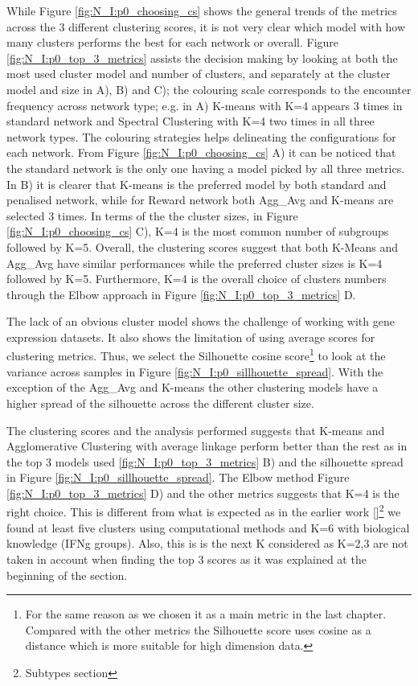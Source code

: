 While Figure \ref{fig:N_I:p0_choosing_cs} shows the general trends of the metrics across the 3 different clustering scores, it is not very clear which model with how many clusters performs the best for each network or overall. Figure \ref{fig:N_I:p0_top_3_metrics} assists the decision making by looking at both the most used cluster model and number of clusters, and separately at the cluster model and size in A), B) and C); the colouring scale corresponds to the encounter frequency across network type; e.g. in A) K-means with K=4 appears 3 times in standard network and Spectral Clustering with K=4 two times in all three network types. The colouring strategies helps delineating the configurations for each network. From Figure \ref{fig:N_I:p0_choosing_cs} A) it can be noticed that the standard network is the only one having a model picked by all three metrics. In B) it is clearer that K-means is the preferred model by both standard and penalised network, while for Reward network both Agg\_Avg and K-means are selected 3 times. In terms of the the cluster sizes, in Figure \ref{fig:N_I:p0_choosing_cs} C), K=4 is the most common number of subgroups followed by K=5. Overall, the clustering scores suggest that both K-Means and Agg\_Avg have similar performances while the preferred cluster sizes is K=4 followed by K=5. Furthermore, K=4 is the overall choice of clusters numbers through the Elbow approach in Figure \ref{fig:N_I:p0_top_3_metrics} D.


The lack of an obvious cluster model shows the challenge of working with gene expression datasets. It also shows the limitation of using average scores for clustering metrics. Thus, we select the Silhouette cosine score\footnote{For the same reason as we chosen it as a main metric in the last chapter. Compared with the other metrics the Silhouette score uses cosine as a distance which is more suitable for high dimension data.} to look at the variance across samples in Figure \ref{fig:N_I:p0_sillhouette_spread}. With the exception of the Agg\_Avg and K-means the other clustering models have a higher spread of the silhouette across the different cluster size.

The clustering scores and the analysis performed suggests that K-means and Agglomerative Clustering with average linkage perform better than the rest as in the top 3 models used \ref{fig:N_I:p0_top_3_metrics} B) and the silhouette spread in Figure \ref{fig:N_I:p0_sillhouette_spread}. The Elbow method Figure \ref{fig:N_I:p0_top_3_metrics} D) and the other metrics suggests that K=4 is the right choice. This is different from what is expected as in the earlier work \ref{}\footnote{Subtypes section} we found at least five clusters using computational methods and K=6 with biological knowledge (IFNg groups). Also, this is is the next K considered as K=2,3 are not taken in account when finding the top 3 scores as it was explained at the beginning of the section.

